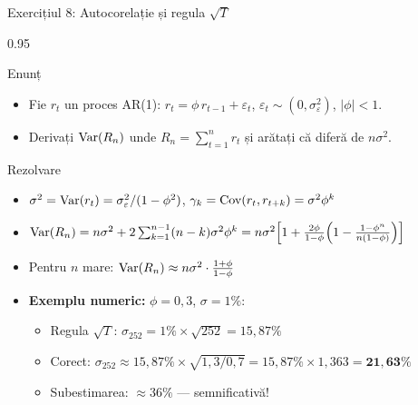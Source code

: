 \documentclass[9pt, aspectratio=169, t]{beamer}
\begin{document}
\begin{frame}[shrink=10]{Exercițiul 8: Autocorelație și regula $\sqrt{T}$}
    \begin{cminipage}{0.95\textwidth}
    \begin{block}{Enunț}
    \begin{itemize}\setlength{\itemsep}{0pt}
        \item Fie $r_t$ un proces AR(1): $r_t = \phi\, r_{t-1} + \varepsilon_t$, $\varepsilon_t \sim (0, \sigma_\varepsilon^2)$, $|\phi| < 1$.
        \item Derivați $\text{Var}(R_n)$ unde $R_n = \sum_{t=1}^n r_t$ și arătați că diferă de $n\sigma^2$.
    \end{itemize}
    \end{block}
    \vspace{0.1cm}
    \begin{exampleblock}{Rezolvare}
    \begin{itemize}\setlength{\itemsep}{0pt}
        \item $\sigma^2 = \text{Var}(r_t) = \sigma_\varepsilon^2 / (1 - \phi^2)$, \quad $\gamma_k = \text{Cov}(r_t, r_{t+k}) = \sigma^2 \phi^k$
        \item $\text{Var}(R_n) = n\sigma^2 + 2\sum_{k=1}^{n-1}(n-k)\sigma^2\phi^k = n\sigma^2\!\left[1 + \frac{2\phi}{1-\phi}\!\left(1 - \frac{1-\phi^n}{n(1-\phi)}\right)\right]$
        \item Pentru $n$ mare: $\text{Var}(R_n) \approx n\sigma^2 \cdot \frac{1+\phi}{1-\phi}$
        \item \textbf{Exemplu numeric:} $\phi = 0{,}3$, $\sigma = 1\%$:
        \begin{itemize}\setlength{\itemsep}{0pt}
            \item Regula $\sqrt{T}$: $\sigma_{252} = 1\% \times \sqrt{252} = 15{,}87\%$
            \item Corect: $\sigma_{252} \approx 15{,}87\% \times \sqrt{1{,}3/0{,}7} = 15{,}87\% \times 1{,}363 = \mathbf{21{,}63\%}$
            \item Subestimarea: $\approx 36\%$ --- semnificativă!
        \end{itemize}
    \end{itemize}
    \end{exampleblock}
    \end{cminipage}
\end{frame}
\end{document}
